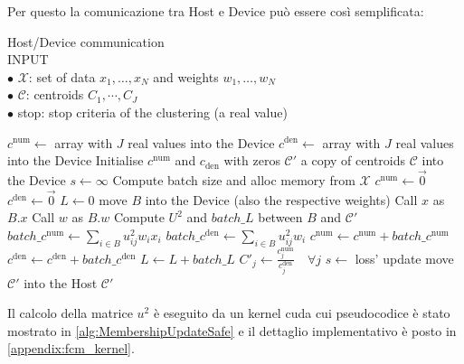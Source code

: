 \begin{toDo}
	\noindent Per questo la comunicazione tra Host e Device può essere così semplificata:


	\begin{algorithm}[ht]
		\caption{Host/Device communication\\
			\textsc{INPUT}\\
			$\bullet$ $\mathcal{X}$: set of data $x_1,\ldots,x_N$ and weights $w_1,\ldots,w_N$\\
			$\bullet$ $\mathcal{C}$: centroids $C_1,\cdots,C_J$\\
			$\bullet$ stop: stop criteria of the clustering (a real value)
		}
		\begin{algorithmic}[1]
				\State $c^\text{num} \gets $ array with $J$ real values into the Device
				\State $c^\text{den} \gets $ array with $J$ real values into the Device
				\State Initialise $c^\text{num}$ and $c_\text{den}$ with zeros
				\State $\mathcal{C}'$ a copy of centroids $\mathcal{C}$ into the Device
				\State $s \gets \infty$
					\State Compute batch size and alloc memory from $\mathcal{X}$
					\State $c^\text{num}\gets \vec{0}$
					\State $c^\text{den}\gets \vec{0}$
					\State $L\gets 0$
						\State move $B$ into the Device (also the respective weights)
						\State Call $x$ as $B.x$
						\State Call $w$ as $B.w$
						\State Compute $U^2$ and $batch\_L$ between $B$ and $\mathcal{C}'$
						\State $batch\_c^\text{num} \gets \sum_{i\in B} u_{ij}^2w_ix_i$
						\State $batch\_c^\text{den} \gets \sum_{i\in B} u_{ij}^2w_i$
						\State $c^\text{num} \gets c^\text{num} + batch\_c^\text{num}$
						\State $c^\text{den} \gets c^\text{den} + batch\_c^\text{den}$
						\State $L\gets L + batch\_L$
					\EndFor
					\State $C'_j \gets \frac{c^\text{num}_j}{ c^\text{den}_j} \quad \forall j$
					\State $s \gets $ loss' update
				\EndWhile
				\State move $\mathcal{C}'$ into the Host
				\State \Return $\mathcal{C}'$
			\EndFunction
			\label{alg:FCMwrapper}
		\end{algorithmic}
	\end{algorithm}

	\noindent Il calcolo della matrice $u^2$ è eseguito da un kernel \gls{cuda} cui pseudocodice è stato mostrato in \cref{alg:MembershipUpdateSafe} e il dettaglio implementativo è posto in \cref{appendix:fcm_kernel}.


\end{toDo}
